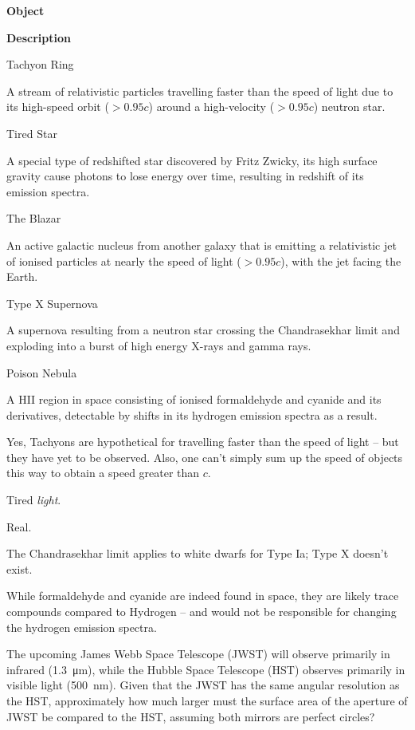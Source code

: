 \documentclass[a4paper,11pt]{exam}
\begin{document}
\begin{questions}
	\tabto{23pt}\parbox[t]{4cm}{\textbf{Object}}  \parbox[t]{\textwidth-4cm}{\textbf{Description}}
	\begin{choices}
		\choice \parbox[t]{4cm}{Tachyon Ring}     \parbox[t]{(\textwidth-4cm)-23pt}{A stream of relativistic particles travelling faster than the speed of light due to its high-speed orbit ($ > 0.95c $) around a high-velocity ($ > 0.95c $) neutron star.}
		\choice	\parbox[t]{4cm}{Tired Star}       \parbox[t]{(\textwidth-4cm)-23pt}{A special type of redshifted star discovered by Fritz Zwicky, its high surface gravity cause photons to lose energy over time, resulting in redshift of its emission spectra.}
		\correctchoice	\parbox[t]{4cm}{The Blazar}       \parbox[t]{(\textwidth-4cm)-23pt}{An active galactic nucleus from another galaxy that is emitting a relativistic jet of ionised particles at nearly the speed of light ($ > 0.95c $), with the jet facing the Earth.}
		\choice	\parbox[t]{4cm}{Type X Supernova} \parbox[t]{(\textwidth-4cm)-23pt}{A supernova resulting from a neutron star crossing the Chandrasekhar limit and exploding into a burst of high energy X-rays and gamma rays.}
		\choice	\parbox[t]{4cm}{Poison Nebula}    \parbox[t]{(\textwidth-4cm)-23pt}{A HII region in space consisting of ionised formaldehyde and cyanide and its derivatives, detectable by shifts in its hydrogen emission spectra as a result.}
	\end{choices}
	\begin{solution}
			Yes, Tachyons are hypothetical for travelling faster than the speed of light – but they have yet to be observed. Also, one can’t simply sum up the speed of objects this way to obtain a speed greater than $ c $.

			Tired \textit{light}.

			Real.

			The Chandrasekhar limit applies to white dwarfs for Type Ia; Type X doesn’t exist.

			While formaldehyde and cyanide are indeed found in space, they are likely trace compounds compared to Hydrogen – and would not be responsible for changing the hydrogen emission spectra.
	\end{solution}

\filbreak
\question
	The upcoming James Webb Space Telescope (JWST) will observe primarily in infrared (\SI{1.3}{\micro\m}), while the Hubble Space Telescope (HST) observes primarily in visible light (\SI{500}{\nano\m}). Given that the JWST has the same angular resolution as the HST, approximately how much larger must the surface area of the aperture of JWST be compared to the HST, assuming both mirrors are perfect circles?


\end{questions}
\end{document}
